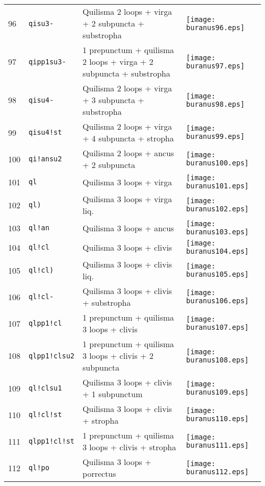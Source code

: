 \documentclass{scrarticle}
\begin{document}
\begin{longtable}{l|l|l|l}
96 & \texttt{qisu3-} & Quilisma 2 loops + virga + 2 subpuncta + substropha & \texttt{[image: buranus96.eps]} \\
97 & \texttt{qipp1su3-} & 1 prepunctum + quilisma 2 loops + virga + 2 subpuncta + substropha & \texttt{[image: buranus97.eps]} \\
98 & \texttt{qisu4-} & Quilisma 2 loops + virga + 3 subpuncta + substropha & \texttt{[image: buranus98.eps]} \\
99 & \texttt{qisu4!st} & Quilisma 2 loops + virga + 4 subpuncta + stropha & \texttt{[image: buranus99.eps]} \\
100 & \texttt{qi!ansu2} & Quilisma 2 loops + ancus + 2 subpuncta & \texttt{[image: buranus100.eps]} \\
101 & \texttt{ql} & Quilisma 3 loops + virga & \texttt{[image: buranus101.eps]} \\
102 & \texttt{ql)} & Quilisma 3 loops + virga liq. & \texttt{[image: buranus102.eps]} \\
103 & \texttt{ql!an} & Quilisma 3 loops + ancus & \texttt{[image: buranus103.eps]} \\
104 & \texttt{ql!cl} & Quilisma 3 loops + clivis & \texttt{[image: buranus104.eps]} \\
105 & \texttt{ql!cl)} & Quilisma 3 loops + clivis liq. & \texttt{[image: buranus105.eps]} \\
106 & \texttt{ql!cl-} & Quilisma 3 loops + clivis + substropha & \texttt{[image: buranus106.eps]} \\
107 & \texttt{qlpp1!cl} & 1 prepunctum + quilisma 3 loops + clivis & \texttt{[image: buranus107.eps]} \\
108 & \texttt{qlpp1!clsu2} & 1 prepunctum + quilisma 3 loops + clivis + 2 subpuncta & \texttt{[image: buranus108.eps]} \\
109 & \texttt{ql!clsu1} & Quilisma 3 loops + clivis + 1 subpunctum & \texttt{[image: buranus109.eps]} \\
110 & \texttt{ql!cl!st} & Quilisma 3 loops + clivis + stropha & \texttt{[image: buranus110.eps]} \\
111 & \texttt{qlpp1!cl!st} & 1 prepunctum + quilisma 3 loops + clivis + stropha & \texttt{[image: buranus111.eps]} \\
112 & \texttt{ql!po} & Quilisma 3 loops + porrectus & \texttt{[image: buranus112.eps]} \\

\end{longtable}
\end{document}
